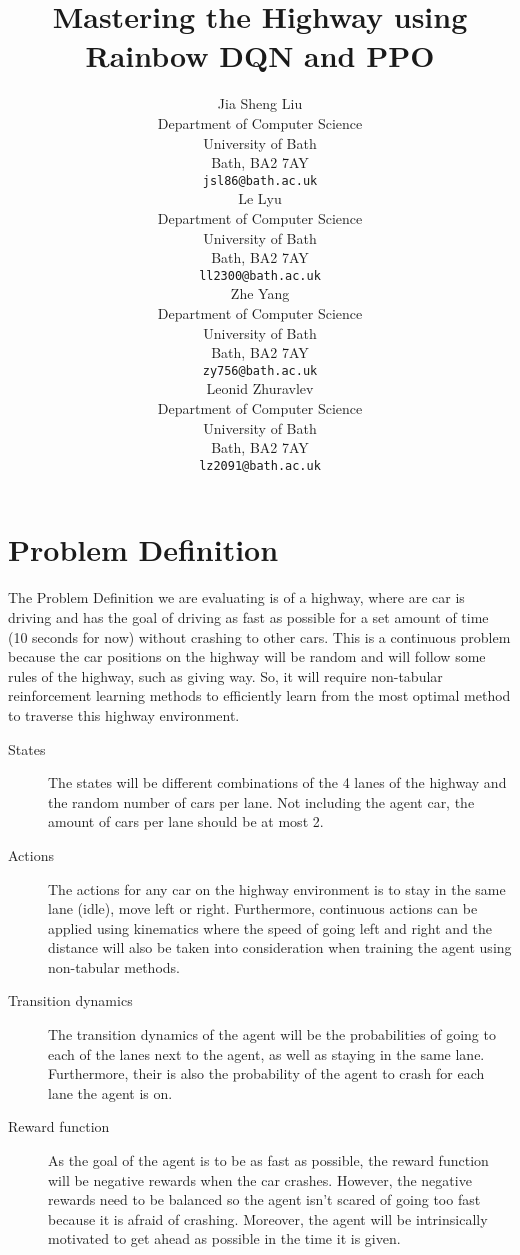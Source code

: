 \documentclass{article}
\title{Mastering the Highway using Rainbow DQN and PPO}
\author{
  Jia Sheng Liu \\
  Department of Computer Science \\
  University of Bath \\
  Bath, BA2 7AY \\
  \texttt{jsl86@bath.ac.uk} \\
  \And
  Le Lyu \\
  Department of Computer Science \\
  University of Bath \\
  Bath, BA2 7AY \\
  \texttt{ll2300@bath.ac.uk} \\
  \And
  Zhe Yang \\
  Department of Computer Science \\
  University of Bath \\
  Bath, BA2 7AY \\
  \texttt{zy756@bath.ac.uk} \\
  \And
  Leonid Zhuravlev \\
  Department of Computer Science \\
  University of Bath \\
  Bath, BA2 7AY \\
  \texttt{lz2091@bath.ac.uk} \\
}
\begin{document}
\maketitle


\section{Problem Definition}


The Problem Definition we are evaluating is of a highway, where are car is driving and has the goal of driving as fast as possible for a set amount of time (10 seconds for now) without crashing to other cars. This is a continuous problem because the car positions on the highway will be random and will follow some rules of the highway, such as giving way. So, it will require non-tabular reinforcement learning methods to efficiently learn from the most optimal method to traverse this highway environment.

\begin{description}
\item[States]The states will be different combinations of the 4 lanes of the highway and the random number of cars per lane. Not including the agent car, the amount of cars per lane should be at most 2.

\item[Actions]The actions for any car on the highway environment is to stay in the same lane (idle), move left or right. Furthermore, continuous actions can be applied using kinematics where the speed of going left and right and the distance will also be taken into consideration when training the agent using non-tabular methods.

\item[Transition dynamics]The transition dynamics of the agent will be the probabilities of going to each of the lanes next to the agent, as well as staying in the same lane. Furthermore, their is also the probability of the agent to crash for each lane the agent is on.

\item[Reward function]As the goal of the agent is to be as fast as possible, the reward function will be negative rewards when the car crashes. However, the negative rewards need to be balanced so the agent isn't scared of going too fast because it is afraid of crashing. Moreover, the agent will be intrinsically motivated to get ahead as possible in the time it is given.
\end{description}
\end{document}

